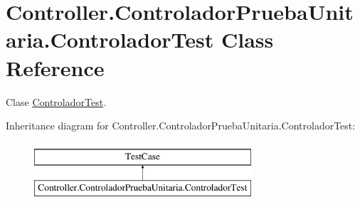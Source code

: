 \hypertarget{class_controller_1_1_controlador_prueba_unitaria_1_1_controlador_test}{}\section{Controller.\+Controlador\+Prueba\+Unitaria.\+Controlador\+Test Class Reference}
\label{class_controller_1_1_controlador_prueba_unitaria_1_1_controlador_test}


Clase \hyperlink{class_controller_1_1_controlador_prueba_unitaria_1_1_controlador_test}{Controlador\+Test}.  


Inheritance diagram for Controller.\+Controlador\+Prueba\+Unitaria.\+Controlador\+Test\+:\begin{figure}[H]
\begin{center}
\leavevmode
\includegraphics[height=2.000000cm]{class_controller_1_1_controlador_prueba_unitaria_1_1_controlador_test}
\end{center}
\end{figure}
